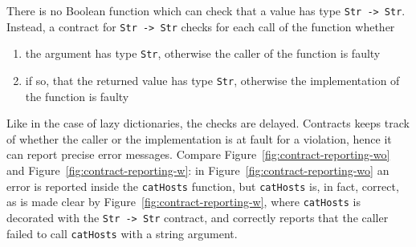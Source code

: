 \documentclass[sigplan,10pt,review,anonymous]{acmart}
\newcommand{\nickel}[1]{\lstinline[language=nickel]{#1}}
\begin{document}
There is no Boolean function which can check that a value has type
\nickel{Str -> Str}. Instead, a contract for \nickel{Str -> Str}
checks for each call of the function whether
\begin{enumerate}
\item the argument has type \nickel{Str}, otherwise the caller of the
  function is faulty
\item if so, that the returned value has type \nickel{Str}, otherwise
  the implementation of the function is faulty
\end{enumerate}

Like in the case of lazy dictionaries, the checks are delayed.
Contracts keeps track of whether the caller or the implementation is
at fault for a violation, hence it can report precise error
messages. Compare Figure~\ref{fig:contract-reporting-wo} and
Figure~\ref{fig:contract-reporting-w}: in
Figure~\ref{fig:contract-reporting-wo} an error is reported inside the
\nickel{catHosts} function, but \nickel{catHosts} is, in fact,
correct, as is made clear by Figure~\ref{fig:contract-reporting-w},
where \nickel{catHosts} is decorated with the \nickel{Str -> Str}
contract, and correctly reports that the caller failed to call
\nickel{catHosts} with a string argument.
\end{document}
